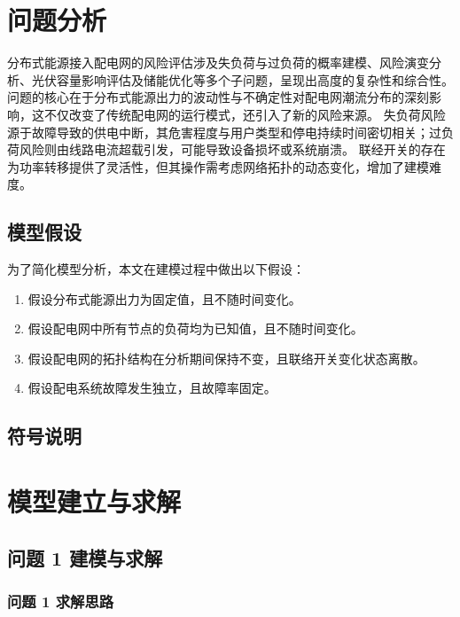 \documentclass{article}
\begin{document}
\section{问题分析}\label{sec:analysis}

分布式能源接入配电网的风险评估涉及失负荷与过负荷的概率建模、风险演变分析、光伏容量影响评估及储能优化等多个子问题，呈现出高度的复杂性和综合性。
问题的核心在于分布式能源出力的波动性与不确定性对配电网潮流分布的深刻影响，这不仅改变了传统配电网的运行模式，还引入了新的风险来源。
失负荷风险源于故障导致的供电中断，其危害程度与用户类型和停电持续时间密切相关；过负荷风险则由线路电流超载引发，可能导致设备损坏或系统崩溃。
联经开关的存在为功率转移提供了灵活性，但其操作需考虑网络拓扑的动态变化，增加了建模难度。

\subsection{模型假设}\label{subsec:assumption}

为了简化模型分析，本文在建模过程中做出以下假设：

\begin{enumerate}
  \item 假设分布式能源出力为固定值，且不随时间变化。
  \item 假设配电网中所有节点的负荷均为已知值，且不随时间变化。
  \item 假设配电网的拓扑结构在分析期间保持不变，且联络开关变化状态离散。
  \item 假设配电系统故障发生独立，且故障率固定。
\end{enumerate}

\subsection{符号说明}\label{subsec:notation}

\section{模型建立与求解}\label{sec:model}

\subsection{问题 1 建模与求解}\label{subsec:problem1}

\subsubsection{问题 1 求解思路}\label{subsubsec:problem1_idea}
\end{document}
